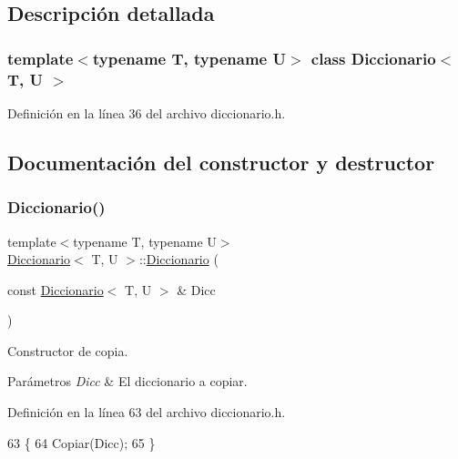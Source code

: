 \subsection{Descripción detallada}
\subsubsection*{template$<$typename T, typename U$>$\newline
class Diccionario$<$ T, U $>$}



Definición en la línea 36 del archivo diccionario.\+h.



\subsection{Documentación del constructor y destructor}
\mbox{\label{classDiccionario_aec12a6b43434389d8e244bb85db29149}} 
\subsubsection{\texorpdfstring{Diccionario()}{Diccionario()}}
{\footnotesize\ttfamily template$<$typename T, typename U$>$ \\
\hyperlink{classDiccionario}{Diccionario}$<$ T, U $>$\+::\hyperlink{classDiccionario}{Diccionario} (\begin{DoxyParamCaption}\item[{const \hyperlink{classDiccionario}{Diccionario}$<$ T, U $>$ \&}]{Dicc }\end{DoxyParamCaption})\hspace{0.3cm}{\ttfamily [inline]}}



Constructor de copia. 


\begin{DoxyParams}{Parámetros}
{\em Dicc} & El diccionario a copiar. \\
\hline
\end{DoxyParams}


Definición en la línea 63 del archivo diccionario.\+h.


\begin{DoxyCode}
63                                          \{
64         Copiar(Dicc);
65     \}
\end{DoxyCode}


